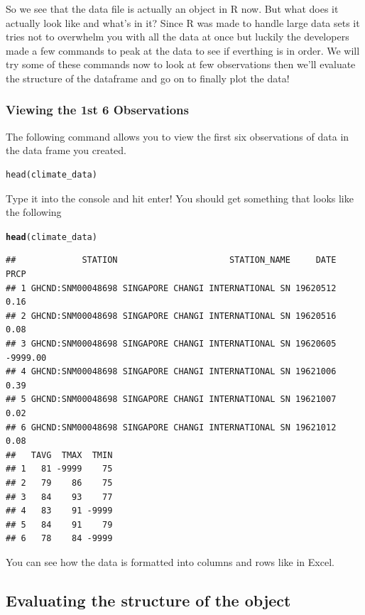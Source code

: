 \documentclass{article}\usepackage[]{graphicx}\usepackage[]{color}
\makeatletter
\newcommand{\hlstd}[1]{\textcolor[rgb]{0.345,0.345,0.345}{#1}}%
\newcommand{\hlkwd}[1]{\textcolor[rgb]{0.737,0.353,0.396}{\textbf{#1}}}%
\newenvironment{kframe}{%
 \def\at@end@of@kframe{}%
 \ifinner\ifhmode%
  \def\at@end@of@kframe{\end{minipage}}%
  \begin{minipage}{\columnwidth}%
 \fi\fi%
 \def\FrameCommand##1{\hskip\@totalleftmargin \hskip-\fboxsep
 \colorbox{shadecolor}{##1}\hskip-\fboxsep
     \hskip-\linewidth \hskip-\@totalleftmargin \hskip\columnwidth}%
 \MakeFramed {\advance\hsize-\width
   \@totalleftmargin\z@ \linewidth\hsize
   \@setminipage}}%
 {\par\unskip\endMakeFramed%
 \at@end@of@kframe}
\newenvironment{knitrout}{}{} %
\makeatother
\begin{document}
So we see that the data file is actually an object in R now. But what does it actually look like and what's in it? 
Since R was made to handle large data sets it tries not to overwhelm you with all the data at once but luckily the developers made a few commands to peak at the data to see if everthing is in order. We will try some of these commands now to look at few observations then we'll evaluate the structure of the dataframe and go on to finally plot the data!

\subsubsection{Viewing the 1st 6 Observations}
The following command allows you to view the first six observations of data in the data frame you created.
\begin{verbatim}
head(climate_data)
\end{verbatim}
Type it into the console and hit enter! You should get something that looks like the following

\begin{knitrout}
\color{fgcolor}\begin{kframe}
\begin{alltt}
\hlkwd{head}\hlstd{(climate_data)}
\end{alltt}
\begin{verbatim}
##             STATION                      STATION_NAME     DATE     PRCP
## 1 GHCND:SNM00048698 SINGAPORE CHANGI INTERNATIONAL SN 19620512     0.16
## 2 GHCND:SNM00048698 SINGAPORE CHANGI INTERNATIONAL SN 19620516     0.08
## 3 GHCND:SNM00048698 SINGAPORE CHANGI INTERNATIONAL SN 19620605 -9999.00
## 4 GHCND:SNM00048698 SINGAPORE CHANGI INTERNATIONAL SN 19621006     0.39
## 5 GHCND:SNM00048698 SINGAPORE CHANGI INTERNATIONAL SN 19621007     0.02
## 6 GHCND:SNM00048698 SINGAPORE CHANGI INTERNATIONAL SN 19621012     0.08
##   TAVG  TMAX  TMIN
## 1   81 -9999    75
## 2   79    86    75
## 3   84    93    77
## 4   83    91 -9999
## 5   84    91    79
## 6   78    84 -9999
\end{verbatim}
\end{kframe}
\end{knitrout}
You can see how the data is formatted into columns and rows like in Excel. 

\subsection{Evaluating the structure of the object}
\end{document}
